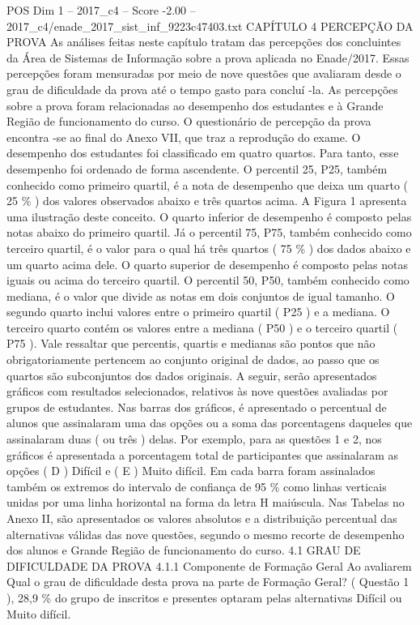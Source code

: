 \begin{textsample}{POS Dim 1 – 2017\_c4 – Score -2.00 – 2017\_c4/enade\_2017\_sist\_inf\_9223c47403.txt}  \label{ex:f1_pos_271}
CAPÍTULO 4 PERCEPÇÃO DA PROVA As análises feitas neste capítulo tratam das percepções dos concluintes da Área de Sistemas de Informação sobre a prova aplicada no Enade/2017.
Essas percepções foram mensuradas por meio de nove questões que avaliaram desde o grau de dificuldade da prova até o tempo gasto para concluí -la.
As percepções sobre a prova foram relacionadas ao desempenho dos estudantes e à Grande Região de funcionamento do curso.
O questionário de percepção da prova encontra -se ao final do Anexo VII, que traz a reprodução do exame.
O desempenho dos estudantes foi classificado em quatro quartos.
Para tanto, esse desempenho foi ordenado de forma ascendente.
O percentil 25, P25, também conhecido como primeiro quartil, é a nota de desempenho que deixa um quarto ( 25 \% ) dos valores observados abaixo e três quartos acima.
A Figura 1 apresenta uma ilustração deste conceito.
O quarto inferior de desempenho é composto pelas notas abaixo do primeiro quartil.
Já o percentil 75, P75, também conhecido como terceiro quartil, é o valor para o qual há três quartos ( 75 \% ) dos dados abaixo e um quarto acima dele.
O quarto superior de desempenho é composto pelas notas iguais ou acima do terceiro quartil.
O percentil 50, P50, também conhecido como mediana, é o valor que divide as notas em dois conjuntos de igual tamanho.
O segundo quarto inclui valores entre o primeiro quartil ( P25 ) e a mediana.
O terceiro quarto contém os valores entre a mediana ( P50 ) e o terceiro quartil ( P75 ).
Vale ressaltar que percentis, quartis e medianas são pontos que não obrigatoriamente pertencem ao conjunto original de dados, ao passo que os quartos são subconjuntos dos dados originais.
A seguir, serão apresentados gráficos com resultados selecionados, relativos às nove questões avaliadas por grupos de estudantes.
Nas barras dos gráficos, é apresentado o percentual de alunos que assinalaram uma das opções ou a soma das porcentagens daqueles que assinalaram duas ( ou três ) delas.
Por exemplo, para as questões 1 e 2, nos gráficos é apresentada a porcentagem total de participantes que assinalaram as opções ( D ) Difícil e ( E ) Muito difícil.
Em cada barra foram assinalados também os extremos do intervalo de confiança de 95 \% como linhas verticais unidas por uma linha horizontal na forma da letra H maiúscula.
Nas Tabelas no Anexo II, são apresentados os valores absolutos e a distribuição percentual das alternativas válidas das nove questões, segundo o mesmo recorte de desempenho dos alunos e Grande Região de funcionamento do curso. 4.1 GRAU DE DIFICULDADE DA PROVA 4.1.1 Componente de Formação Geral Ao avaliarem Qual o grau de dificuldade desta prova na parte de Formação Geral? ( Questão 1 ), 28,9 \% do grupo de inscritos e presentes optaram pelas alternativas Difícil ou Muito difícil.

\end{textsample}
